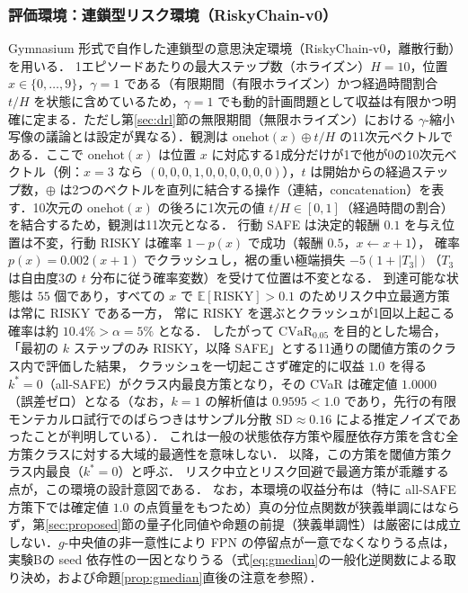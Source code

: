 \documentclass[a4paper,10pt]{jsarticle}
\theoremstyle{definition}
\newcommand{\CVaR}{\mathrm{CVaR}}
\newcommand{\E}{\mathbb{E}}
\begin{document}
\subsubsection{評価環境：連鎖型リスク環境（RiskyChain-v0）}
Gymnasium 形式で自作した連鎖型の意思決定環境（RiskyChain-v0，離散行動）を用いる．
1エピソードあたりの最大ステップ数（ホライズン）$H=10$，位置 $x\in\{0,\dots,9\}$，$\gamma=1$ である（有限期間（有限ホライズン）かつ経過時間割合 $t/H$ を状態に含めているため，$\gamma=1$ でも動的計画問題として収益は有限かつ明確に定まる．ただし第\ref{sec:drl}節の無限期間（無限ホライズン）における $\gamma$-縮小写像の議論とは設定が異なる）．観測は $\mathrm{onehot}(x)\oplus t/H$ の11次元ベクトルである．ここで $\mathrm{onehot}(x)$ は位置 $x$ に対応する1成分だけが1で他が0の10次元ベクトル（例：$x=3$ なら $(0,0,0,1,0,0,0,0,0,0)$），$t$ は開始からの経過ステップ数，$\oplus$ は2つのベクトルを直列に結合する操作（連結，concatenation）を表す．10次元の $\mathrm{onehot}(x)$ の後ろに1次元の値 $t/H\in[0,1]$（経過時間の割合）を結合するため，観測は11次元となる．
行動 SAFE は決定的報酬 $0.1$ を与え位置は不変，行動 RISKY は確率 $1-p(x)$ で成功（報酬 $0.5$，$x\leftarrow x+1$），
確率 $p(x)=0.002(x+1)$ でクラッシュし，裾の重い極端損失 $-5(1+|T_3|)$（$T_3$ は自由度3の $t$ 分布に従う確率変数）を受けて位置は不変となる．
到達可能な状態は $55$ 個であり，すべての $x$ で $\E[\mathrm{RISKY}]>0.1$ のためリスク中立最適方策は常に RISKY である一方，
常に RISKY を選ぶとクラッシュが1回以上起こる確率は約 $10.4\%>\alpha=5\%$ となる．
したがって $\CVaR_{0.05}$ を目的とした場合，「最初の $k$ ステップのみ RISKY，以降 SAFE」とする11通りの閾値方策のクラス内で評価した結果，
クラッシュを一切起こさず確定的に収益 $1.0$ を得る $k^*=0$（all-SAFE）がクラス内最良方策となり，その CVaR は確定値 $1.0000$（誤差ゼロ）となる（なお，$k=1$ の解析値は $0.9595<1.0$ であり，先行の有限モンテカルロ試行でのばらつきはサンプル分散 $\mathrm{SD}\approx0.16$ による推定ノイズであったことが判明している）．
これは一般の状態依存方策や履歴依存方策を含む全方策クラスに対する大域的最適性を意味しない．
以降，この方策を閾値方策クラス内最良（$k^*=0$）と呼ぶ．
リスク中立とリスク回避で最適方策が乖離する点が，この環境の設計意図である．
なお，本環境の収益分布は（特に all-SAFE 方策下では確定値 $1.0$ の点質量をもつため）真の分位点関数が狭義単調にはならず，第\ref{sec:proposed}節の量子化同値や命題の前提（狭義単調性）は厳密には成立しない．$g$-中央値の非一意性により FPN の停留点が一意でなくなりうる点は，実験Bの seed 依存性の一因となりうる（式\eqref{eq:gmedian}の一般化逆関数による取り決め，および命題\ref{prop:gmedian}直後の注意を参照）．
\end{document}
